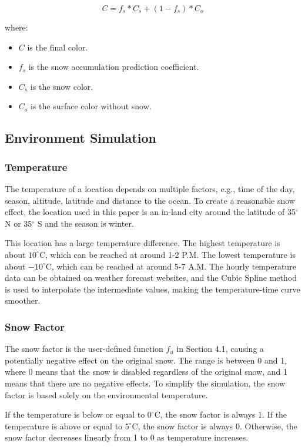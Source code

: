 \documentclass{article}
\begin{document}
\[
  C = f_{s} * C_{s} + (1-f_{s}) * C_{o}
\]

where:
\begin{itemize}
  \item \( C \) is the final color.
  \item \( f_{s} \) is the snow accumulation prediction coefficient.
  \item \( C_{s} \) is the snow color.
  \item \( C_{o} \) is the surface color without snow.
\end{itemize}

\subsection {Environment Simulation}

\subsubsection {Temperature}
The temperature of a location depends on multiple factors, e.g., time of the day, season, altitude, 
latitude and distance to the ocean. To create a reasonable snow effect, the location used in this paper 
is an in-land city around the latitude of 35$^{\circ}$ N or 35$^{\circ}$ S and the season is winter.

This location has a large temperature difference. The highest temperature is about 
\(10^\circ\mathrm{C}\), which can be reached at around 1-2 P.M. The lowest temperature is about 
\(-10^\circ\mathrm{C}\), which can be reached at around 5-7 A.M. The hourly temperature data can be
obtained on weather forecast websites, and the Cubic Spline method is used to interpolate the 
intermediate values, making the temperature-time curve smoother.

\subsubsection {Snow Factor}
The snow factor is the user-defined function \( f_{u} \) in Section 4.1, causing a potentially negative 
effect on the original snow. The range is between 0 and 1, where 0 means that the snow is disabled 
regardless of the original snow, and 1 means that there are no negative effects. To simplify the 
simulation, the snow factor is based solely on the environmental temperature. 

If the temperature is below or equal to \(0^\circ\mathrm{C}\), the snow factor is always 1. 
If the temperature is above or equal to \(5^\circ\mathrm{C}\), the snow factor is always 0. 
Otherwise, the snow factor decreases linearly from 1 to 0 as temperature increases.
\end{document}
